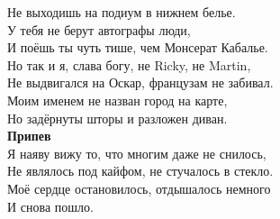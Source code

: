 \documentclass[fleqn,a5paper,12pt,twoside]{guitartabs}
\begin{document}
    Не выходишь на подиум в нижнем белье.\\
    У тебя не берут автографы люди,\\
    И поёшь ты чуть тише, чем Монсерат Кабалье.\\
    Но так и я, слава богу, не Ricky, не Martin,\\
    Не выдвигался на Оскар, французам не забивал.\\
    Моим именем не назван город на карте,\\
    Но задёрнуты шторы и разложен диван.\\
    \-\hspace{10mm}\textbf{Припев}\\
    Я наяву вижу то, что многим даже не снилось,\\
    Не являлось под кайфом, не стучалось в стекло.\\
    Моё сердце остановилось, отдышалось немного\\
    И снова пошло.
\newpage
{}%
\end{document}

